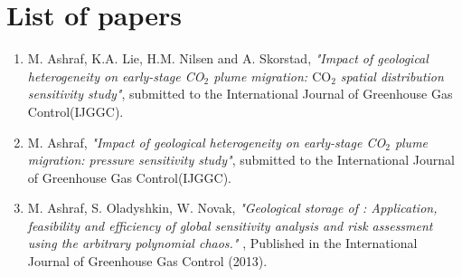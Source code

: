 \chapter{List of papers}

\begin{enumerate}

\item {M. Ashraf, K.A. Lie, H.M. Nilsen and A. Skorstad}, \textit{"Impact of
geological heterogeneity on early-stage {CO}$_2$ plume migration: $\mbox{CO}_2$
spatial distribution sensitivity study"}, submitted to the International Journal of
Greenhouse Gas Control(IJGGC). 

\item {M. Ashraf}, \textit{"Impact of geological heterogeneity on early-stage
{CO}$_2$ plume migration: pressure sensitivity study"}, submitted to the
International Journal of Greenhouse Gas Control(IJGGC).  

\item {M. Ashraf, S. Oladyshkin, W. Novak}, \textit{"Geological storage of \coo: Application, feasibility and efficiency of global sensitivity analysis and risk assessment using the arbitrary polynomial chaos." }, Published in the International Journal of Greenhouse Gas Control (2013).

\end{enumerate}
